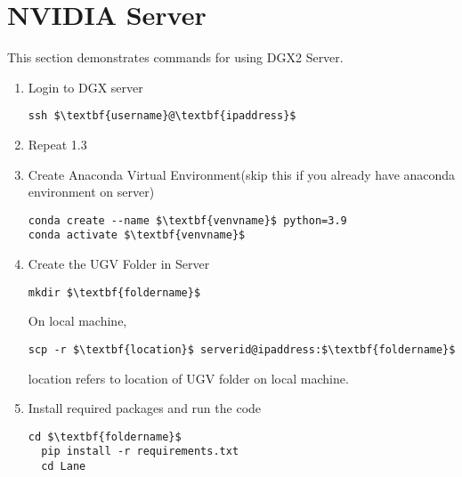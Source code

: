 \documentclass[journal,12pt,twocolumn]{IEEEtran}
\numberwithin{equation}{section}
\renewcommand\thesection{\arabic{section}}
\begin{document}
\section{NVIDIA Server}
This section demonstrates commands for using DGX2 Server.
\begin{enumerate}[label=\thesection.\arabic*.,ref=\thesection.\theenumi]
\item Login to DGX server
\begin{lstlisting}[mathescape=true]
ssh $\textbf{username}@\textbf{ipaddress}$
\end{lstlisting}
\item Repeat 1.3
\item Create Anaconda Virtual Environment(skip this if you already have anaconda environment on server)
\begin{lstlisting}[mathescape=true]
conda create --name $\textbf{venvname}$ python=3.9
conda activate $\textbf{venvname}$
\end{lstlisting}
\item Create the UGV Folder in Server
\begin{lstlisting}[mathescape=true]
mkdir $\textbf{foldername}$
\end{lstlisting}
On local machine,
\begin{lstlisting}[mathescape=true]
scp -r $\textbf{location}$ serverid@ipaddress:$\textbf{foldername}$
\end{lstlisting}
location refers to location of UGV folder on local machine.
\item Install required packages and run the code
\begin{lstlisting}[mathescape=true]
  cd $\textbf{foldername}$
  pip install -r requirements.txt
  cd Lane
\end{lstlisting}
\end{enumerate}
\end{document}
